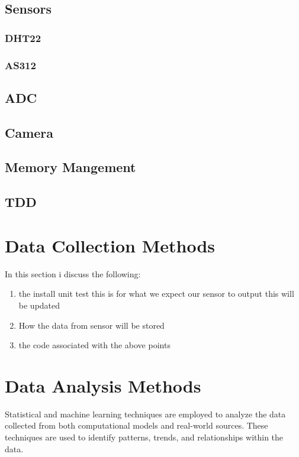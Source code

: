 \subsection{Sensors}


\subsubsection{DHT22}

\subsubsection{AS312}


\subsection{ADC}
\subsection{Camera}

\subsection{Memory Mangement}


\subsection{TDD}

\section{Data Collection Methods}
In this section  i discuss the  following:
\begin{enumerate}
    \item the  install  unit test this is for  what we  expect  our  sensor  to  output this  will  be  updated
    \item How  the data  from sensor will be stored 
    \item the code  associated   with the above points 
\end{enumerate}



\section{Data Analysis Methods}

Statistical and machine learning techniques are employed to analyze the data collected from both computational models and real-world sources. These techniques are used to identify patterns, trends, and relationships within the data.

